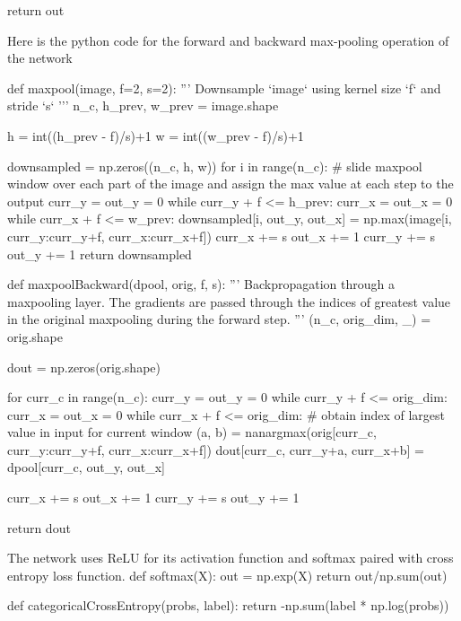     return out
\stoptyping
\stopsubsection

\startsubsection[title=Max pooling]
Here is the python code for the forward and backward max-pooling operation of the network

\starttyping
def maxpool(image, f=2, s=2):
    '''
    Downsample `image` using kernel size `f` and stride `s`
    '''
    n_c, h_prev, w_prev = image.shape
    
    h = int((h_prev - f)/s)+1
    w = int((w_prev - f)/s)+1
    
    downsampled = np.zeros((n_c, h, w))
    for i in range(n_c):
        # slide maxpool window over each part of the image and assign the max value at each step to the output
        curr_y = out_y = 0
        while curr_y + f <= h_prev:
            curr_x = out_x = 0
            while curr_x + f <= w_prev:
                downsampled[i, out_y, out_x] = np.max(image[i, curr_y:curr_y+f, curr_x:curr_x+f])
                curr_x += s
                out_x += 1
            curr_y += s
            out_y += 1
    return downsampled
\stoptyping

\starttyping
def maxpoolBackward(dpool, orig, f, s):
    '''
    Backpropagation through a maxpooling layer. The gradients are passed through the indices of greatest value in the original maxpooling during the forward step.
    '''
    (n_c, orig_dim, _) = orig.shape
    
    dout = np.zeros(orig.shape)
    
    for curr_c in range(n_c):
        curr_y = out_y = 0
        while curr_y + f <= orig_dim:
            curr_x = out_x = 0
            while curr_x + f <= orig_dim:
                # obtain index of largest value in input for current window
                (a, b) = nanargmax(orig[curr_c, curr_y:curr_y+f, curr_x:curr_x+f])
                dout[curr_c, curr_y+a, curr_x+b] = dpool[curr_c, out_y, out_x]
                
                curr_x += s
                out_x += 1
            curr_y += s
            out_y += 1
        
    return dout
\stoptyping
\stopsubsection

\startsubsection[title=Various functions]
The network uses ReLU for its activation function and softmax paired with cross entropy loss function.
\starttyping
def softmax(X):
    out = np.exp(X)
    return out/np.sum(out)

def categoricalCrossEntropy(probs, label):
    return -np.sum(label * np.log(probs))
\stoptyping
\stopsubsection

